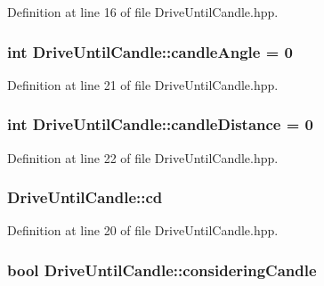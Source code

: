 Definition at line 16 of file Drive\-Until\-Candle.\-hpp.

\hypertarget{classDriveUntilCandle_a786f5c46c30956d8fafdd57f143b4960}{
\subsubsection[{candle\-Angle}]{\setlength{\rightskip}{0pt plus 5cm}int Drive\-Until\-Candle\-::candle\-Angle = 0\hspace{0.3cm}{\ttfamily [private]}}}\label{classDriveUntilCandle_a786f5c46c30956d8fafdd57f143b4960}


Definition at line 21 of file Drive\-Until\-Candle.\-hpp.

\hypertarget{classDriveUntilCandle_a36b2ce9badf48a77df0ce3ecd38922ec}{
\subsubsection[{candle\-Distance}]{\setlength{\rightskip}{0pt plus 5cm}int Drive\-Until\-Candle\-::candle\-Distance = 0\hspace{0.3cm}{\ttfamily [private]}}}\label{classDriveUntilCandle_a36b2ce9badf48a77df0ce3ecd38922ec}


Definition at line 22 of file Drive\-Until\-Candle.\-hpp.

\hypertarget{classDriveUntilCandle_af93647db50bc410773c8399642b91450}{
\subsubsection[{cd}]{ Drive\-Until\-Candle\-::cd\hspace{0.3cm}{\ttfamily [private]}}}\label{classDriveUntilCandle_af93647db50bc410773c8399642b91450}


Definition at line 20 of file Drive\-Until\-Candle.\-hpp.

\hypertarget{classDriveUntilCandle_a4a3766796623146b80c0a3fa083136d3}{
\subsubsection[{considering\-Candle}]{\setlength{\rightskip}{0pt plus 5cm}bool Drive\-Until\-Candle\-::considering\-Candle\hspace{0.3cm}{\ttfamily [private]}}}\label{classDriveUntilCandle_a4a3766796623146b80c0a3fa083136d3}


